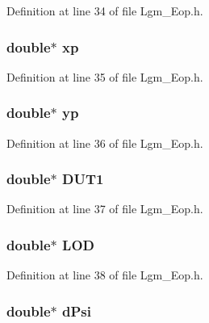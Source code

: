 Definition at line 34 of file Lgm\_\-Eop.h.\hypertarget{struct_lgm___eop_7df365c58843453a02cae2d62640973b}{
\subsubsection[{xp}]{\setlength{\rightskip}{0pt plus 5cm}double$\ast$ {\bf xp}}}
\label{struct_lgm___eop_7df365c58843453a02cae2d62640973b}




Definition at line 35 of file Lgm\_\-Eop.h.\hypertarget{struct_lgm___eop_ac4115a8887b9279e971e048bfb884cf}{
\subsubsection[{yp}]{\setlength{\rightskip}{0pt plus 5cm}double$\ast$ {\bf yp}}}
\label{struct_lgm___eop_ac4115a8887b9279e971e048bfb884cf}




Definition at line 36 of file Lgm\_\-Eop.h.\hypertarget{struct_lgm___eop_d6fc3c97f5535af67f2197e9d52ea69a}{
\subsubsection[{DUT1}]{\setlength{\rightskip}{0pt plus 5cm}double$\ast$ {\bf DUT1}}}
\label{struct_lgm___eop_d6fc3c97f5535af67f2197e9d52ea69a}




Definition at line 37 of file Lgm\_\-Eop.h.\hypertarget{struct_lgm___eop_91322cde3538911ebb7cf286c4ef7820}{
\subsubsection[{LOD}]{\setlength{\rightskip}{0pt plus 5cm}double$\ast$ {\bf LOD}}}
\label{struct_lgm___eop_91322cde3538911ebb7cf286c4ef7820}




Definition at line 38 of file Lgm\_\-Eop.h.\hypertarget{struct_lgm___eop_dd3e57915cc3b1840af16e8c18f1d17f}{
\subsubsection[{dPsi}]{\setlength{\rightskip}{0pt plus 5cm}double$\ast$ {\bf dPsi}}}
\label{struct_lgm___eop_dd3e57915cc3b1840af16e8c18f1d17f}




